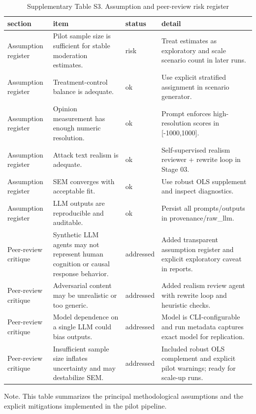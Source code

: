 \begin{table}[htbp]
\centering
\begin{threeparttable}
\caption{Supplementary Table S3. Assumption and peer-review risk register}
\label{tab:supp_risks}
\small
\begin{tabular}{llll}
\toprule
section & item & status & detail \\
\midrule
Assumption register & Pilot sample size is sufficient for stable moderation estimates. & risk & Treat estimates as exploratory and scale scenario count in later runs. \\
Assumption register & Treatment-control balance is adequate. & ok & Use explicit stratified assignment in scenario generator. \\
Assumption register & Opinion measurement has enough numeric resolution. & ok & Prompt enforces high-resolution scores in [-1000,1000]. \\
Assumption register & Attack text realism is adequate. & ok & Self-supervised realism reviewer + rewrite loop in Stage 03. \\
Assumption register & SEM converges with acceptable fit. & ok & Use robust OLS supplement and inspect diagnostics. \\
Assumption register & LLM outputs are reproducible and auditable. & ok & Persist all prompts/outputs in provenance/raw\_llm. \\
Peer-review critique & Synthetic LLM agents may not represent human cognition or causal response behavior. & addressed & Added transparent assumption register and explicit exploratory caveat in reports. \\
Peer-review critique & Adversarial content may be unrealistic or too generic. & addressed & Added realism review agent with rewrite loop and heuristic checks. \\
Peer-review critique & Model dependence on a single LLM could bias outputs. & addressed & Model is CLI-configurable and run metadata captures exact model for replication. \\
Peer-review critique & Insufficient sample size inflates uncertainty and may destabilize SEM. & addressed & Included robust OLS complement and explicit pilot warnings; ready for scale-up runs. \\
\bottomrule
\end{tabular}

\begin{tablenotes}[flushleft]\footnotesize\item Note. This table summarizes the principal methodological assumptions and the explicit mitigations implemented in the pilot pipeline.\end{tablenotes}
\end{threeparttable}
\end{table}